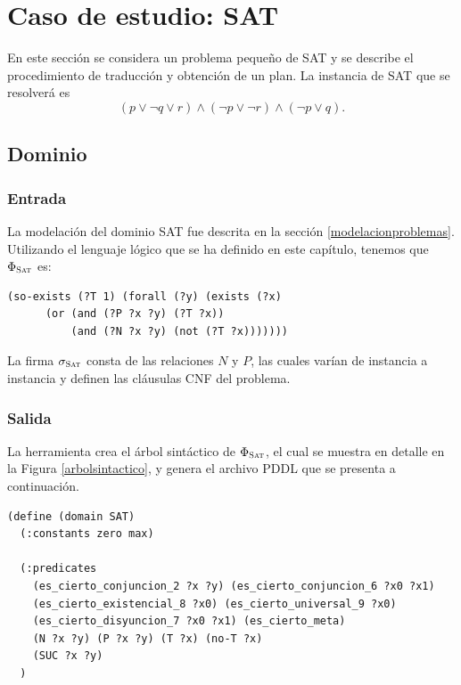 
\chapter{Caso de estudio: SAT}
\label{apendiceB}

En este sección se considera un problema pequeño de SAT y se describe el
procedimiento de traducción y obtención de un plan.
La instancia de SAT que se resolverá es
\begin{equation}
\label{satinstance}
(p \lor \neg q \lor r) \land (\neg p \lor \neg r) \land (\neg p \lor q).
\end{equation}

\section{Dominio}
\subsection{Entrada}
La modelación del dominio SAT fue descrita en la sección
\ref{modelacionproblemas}. Utilizando el lenguaje lógico que se ha definido en
este capítulo, tenemos que $\Phi_{\textsc{Sat}}$ es:
\begin{verbatim}
(so-exists (?T 1) (forall (?y) (exists (?x)
      (or (and (?P ?x ?y) (?T ?x)) 
          (and (?N ?x ?y) (not (?T ?x)))))))
\end{verbatim}

La firma $\sigma_{\textsc{Sat}}$ consta de las relaciones $N$ y $P$, las cuales 
varían de instancia a instancia y definen las cláusulas CNF del problema.

\subsection{Salida}
La herramienta crea el árbol sintáctico de $\Phi_{\textsc{Sat}}$, el cual se muestra en
detalle en la Figura \ref{arbolsintactico}, y genera el archivo PDDL que se
presenta a continuación.

\begin{verbatim}
(define (domain SAT)
  (:constants zero max)

  (:predicates
    (es_cierto_conjuncion_2 ?x ?y) (es_cierto_conjuncion_6 ?x0 ?x1)
    (es_cierto_existencial_8 ?x0) (es_cierto_universal_9 ?x0)
    (es_cierto_disyuncion_7 ?x0 ?x1) (es_cierto_meta)
    (N ?x ?y) (P ?x ?y) (T ?x) (no-T ?x)
    (SUC ?x ?y)
  )
\end{verbatim}


